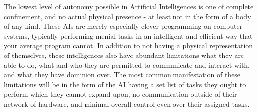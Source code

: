 The lowest level of autonomy possible in Artificial Intelligences is one of complete confinement, and no actual physical presence - at least not in the form of a body of any kind. These AIs are merely especially clever programming on computer systems, typically performing menial tasks in an intelligent and efficient way that your average program cannot. In addition to not having a physical representation of themselves, these intelligences also have abundant limitations what they are able to do, what and who they are permitted to communicate and interact with, and what they have dominion over. The most common manifestation of these limitations will be in the form of the AI having a set list of tasks they ought to perform which they cannot expand upon, no communication outside of their network of hardware, and minimal overall control even over their assigned tasks.